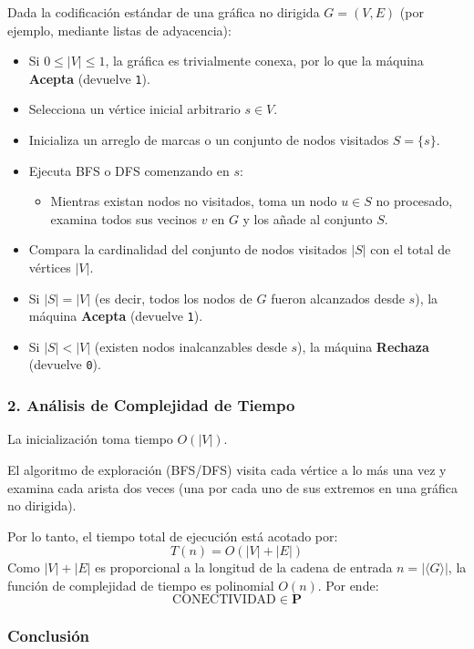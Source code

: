 \begin{itemize}[leftmargin=*]
    Dada la codificación estándar de una gráfica no dirigida $G = (V, E)$ (por ejemplo, mediante listas de adyacencia):
    \begin{itemize}[leftmargin=*]
        \item Si $0 \le |V| \le 1$, la gráfica es trivialmente conexa, por lo que la máquina \textbf{Acepta} (devuelve \texttt{1}).
        \item Selecciona un vértice inicial arbitrario $s \in V$.
        \item Inicializa un arreglo de marcas o un conjunto de nodos visitados $S = \{s\}$.
        \item Ejecuta BFS o DFS comenzando en $s$:
        \begin{itemize}[leftmargin=*]
            \item Mientras existan nodos no visitados, toma un nodo $u \in S$ no procesado, examina todos sus vecinos $v$ en $G$ y los añade al conjunto $S$.
        \end{itemize}
        \item Compara la cardinalidad del conjunto de nodos visitados $|S|$ con el total de vértices $|V|$.
        \item Si $|S| = |V|$ (es decir, todos los nodos de $G$ fueron alcanzados desde $s$), la máquina \textbf{Acepta} (devuelve \texttt{1}).
        \item Si $|S| < |V|$ (existen nodos inalcanzables desde $s$), la máquina \textbf{Rechaza} (devuelve \texttt{0}).
    \end{itemize}

    \subsubsection*{2. Análisis de Complejidad de Tiempo}

    La inicialización toma tiempo $O(|V|)$.
    
    El algoritmo de exploración (BFS/DFS) visita cada vértice a lo más una vez y examina cada arista dos veces (una por cada uno de sus extremos en una gráfica no dirigida).
    
    Por lo tanto, el tiempo total de ejecución está acotado por:
    \[ T(n) = O(|V| + |E|) \]
    Como $|V| + |E|$ es proporcional a la longitud de la cadena de entrada $n = |\langle G \rangle|$, la función de complejidad de tiempo es polinomial $O(n)$. Por ende:
    \[ \text{CONECTIVIDAD} \in \mathbf{P} \]


    \subsubsection*{Conclusión}


\end{itemize}
